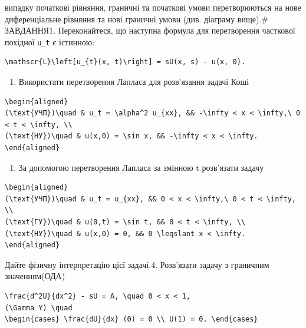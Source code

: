 \documentclass[
  ukrainian,
]{article}
\providecommand{\tightlist}{%
  \setlength{\itemsep}{0pt}\setlength{\parskip}{0pt}}
\begin{document}
випадку початкові рівняння, граничні та початкові умови перетворюються
на нове диференціальне рівняння та нові граничні умови (див. діаграму
вище).\# ЗАВДАННЯ1. Переконайтеся, що наступна формула для перетворення
часткової похідної \texttt{u\_t} є істинною:

\begin{verbatim}
\mathscr{L}\left[u_{t}(x, t)\right] = sU(x, s) - u(x, 0).
\end{verbatim}

\begin{enumerate}
\def\labelenumi{\arabic{enumi}.}
\setcounter{enumi}{1}
\tightlist
\item
  Використати перетворення Лапласа для розв'язання задачі Коші
\end{enumerate}

\begin{verbatim}
\begin{aligned}
(\text{УЧП})\quad & u_t = \alpha^2 u_{xx}, && -\infty < x < \infty,\ 0 < t < \infty, \\
(\text{НУ})\quad & u(x,0) = \sin x, && -\infty < x < \infty.
\end{aligned}
\end{verbatim}

\begin{enumerate}
\def\labelenumi{\arabic{enumi}.}
\setcounter{enumi}{2}
\tightlist
\item
  За допомогою перетворення Лапласа за змінною t розв'язати задачу
\end{enumerate}

\begin{verbatim}
\begin{aligned}
(\text{УЧП})\quad & u_t = u_{xx}, && 0 < x < \infty,\ 0 < t < \infty, \\
(\text{ГУ})\quad & u(0,t) = \sin t, && 0 < t < \infty, \\
(\text{НУ})\quad & u(x,0) = 0, && 0 \leqslant x < \infty.
\end{aligned}
\end{verbatim}

Дайте фізичну інтерпретацію цієї задачі.4. Розв'язати задачу з граничним
значенням(ОДА)

\begin{verbatim}
\frac{d^2U}{dx^2} - sU = A, \quad 0 < x < 1,
(\Gamma Y) \quad
\begin{cases} \frac{dU}{dx} (0) = 0 \\ U(1) = 0. \end{cases}
\end{verbatim}
\end{document}
